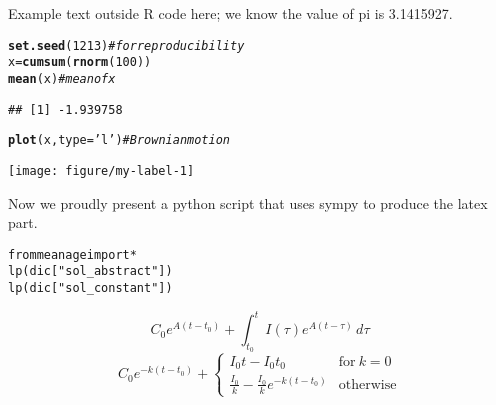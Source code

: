 \documentclass[a4paper]{article}\usepackage[]{graphicx}\usepackage[]{color}
\makeatletter
\def\maxwidth{ %
  \ifdim\Gin@nat@width>\linewidth
    \linewidth
  \else
    \Gin@nat@width
  \fi
}
\newcommand{\hlnum}[1]{\textcolor[rgb]{0.686,0.059,0.569}{#1}}%
\newcommand{\hlstr}[1]{\textcolor[rgb]{0.192,0.494,0.8}{#1}}%
\newcommand{\hlcom}[1]{\textcolor[rgb]{0.678,0.584,0.686}{\textit{#1}}}%
\newcommand{\hlstd}[1]{\textcolor[rgb]{0.345,0.345,0.345}{#1}}%
\newcommand{\hlkwb}[1]{\textcolor[rgb]{0.69,0.353,0.396}{#1}}%
\newcommand{\hlkwc}[1]{\textcolor[rgb]{0.333,0.667,0.333}{#1}}%
\newcommand{\hlkwd}[1]{\textcolor[rgb]{0.737,0.353,0.396}{\textbf{#1}}}%
\newenvironment{kframe}{%
 \def\at@end@of@kframe{}%
 \ifinner\ifhmode%
  \def\at@end@of@kframe{\end{minipage}}%
  \begin{minipage}{\columnwidth}%
 \fi\fi%
 \def\FrameCommand##1{\hskip\@totalleftmargin \hskip-\fboxsep
 \colorbox{shadecolor}{##1}\hskip-\fboxsep
     \hskip-\linewidth \hskip-\@totalleftmargin \hskip\columnwidth}%
 \MakeFramed {\advance\hsize-\width
   \@totalleftmargin\z@ \linewidth\hsize
   \@setminipage}}%
 {\par\unskip\endMakeFramed%
 \at@end@of@kframe}
\newenvironment{knitrout}{}{} %
\makeatother
\begin{document}
Example text outside R code here; we know the value of pi is 3.1415927.

\begin{knitrout}
\color{fgcolor}\begin{kframe}
\begin{alltt}
\hlkwd{set.seed}\hlstd{(}\hlnum{1213}\hlstd{)}  \hlcom{# for reproducibility}
\hlstd{x} \hlkwb{=} \hlkwd{cumsum}\hlstd{(}\hlkwd{rnorm}\hlstd{(}\hlnum{100}\hlstd{))}
\hlkwd{mean}\hlstd{(x)}  \hlcom{# mean of x}
\end{alltt}
\begin{verbatim}
## [1] -1.939758
\end{verbatim}
\begin{alltt}
\hlkwd{plot}\hlstd{(x,} \hlkwc{type} \hlstd{=} \hlstr{'l'}\hlstd{)}  \hlcom{# Brownian motion}
\end{alltt}
\end{kframe}
\texttt{[image: figure/my-label-1]} 

\end{knitrout}

Now we proudly present a python script that uses sympy to produce the latex part.
\begin{kframe}
\begin{alltt}
from meanage import *
lp(dic["sol_abstract"])
lp(dic["sol_constant"])
\end{alltt}

\end{kframe}\[C_{0} e^{A{\left (t - t_{0} \right )}} + \int_{t_{0}}^{t} I{\left (\tau \right )} e^{A{\left (t - \tau \right )}}\, d\tau\]
\[C_{0} e^{- k \left(t - t_{0}\right)} + \begin{cases} I_{0} t - I_{0} t_{0} & \text{for}\: k = 0 \\\frac{I_{0}}{k} - \frac{I_{0}}{k} e^{- k \left(t - t_{0}\right)} & \text{otherwise} \end{cases}\]
\end{document}
